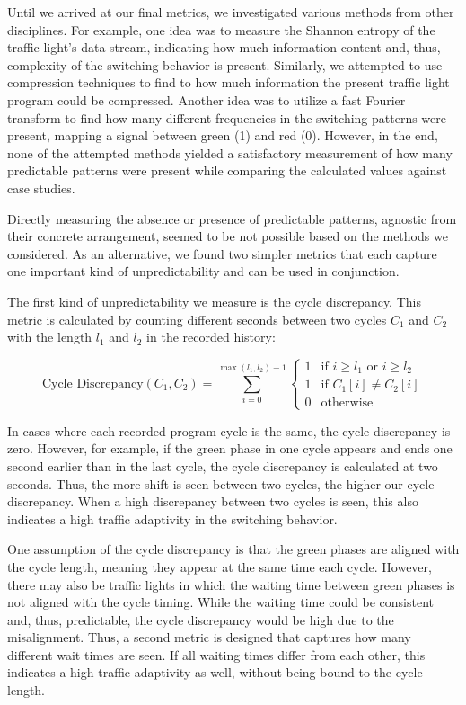 Until we arrived at our final metrics, we investigated various methods from other disciplines. For example, one idea was to measure the Shannon entropy of the traffic light's data stream, indicating how much information content and, thus, complexity of the switching behavior is present. Similarly, we attempted to use compression techniques to find to how much information the present traffic light program could be compressed. Another idea was to utilize a fast Fourier transform to find how many different frequencies in the switching patterns were present, mapping a signal between green (1) and red (0). However, in the end, none of the attempted methods yielded a satisfactory measurement of how many predictable patterns were present while comparing the calculated values against case studies. 

Directly measuring the absence or presence of predictable patterns, agnostic from their concrete arrangement, seemed to be not possible based on the methods we considered. As an alternative, we found two simpler metrics that each capture one important kind of unpredictability and can be used in conjunction.

The first kind of unpredictability we measure is the cycle discrepancy. This metric is calculated by counting different seconds between two cycles $C_1$ and $C_2$ with the length $l_1$ and $l_2$ in the recorded history:

\begin{equation} \text{Cycle Discrepancy}(C_1, C_2) =  \sum_{i=0}^{\max(l_1, l_2)-1} \left\{
\begin{array}{ll}
1 & \text{if } i \geq l_1 \text{ or } i \geq l_2 \\
1 & \text{if } C_1[i] \neq C_2[i] \\
0 & \text{otherwise}
\end{array} \right.\end{equation}

In cases where each recorded program cycle is the same, the cycle discrepancy is zero. However, for example, if the green phase in one cycle appears and ends one second earlier than in the last cycle, the cycle discrepancy is calculated at two seconds. Thus, the more shift is seen between two cycles, the higher our cycle discrepancy. When a high discrepancy between two cycles is seen, this also indicates a high traffic adaptivity in the switching behavior.

One assumption of the cycle discrepancy is that the green phases are aligned with the cycle length, meaning they appear at the same time each cycle. However, there may also be traffic lights in which the waiting time between green phases is not aligned with the cycle timing. While the waiting time could be consistent and, thus, predictable, the cycle discrepancy would be high due to the misalignment. Thus, a second metric is designed that captures how many different wait times are seen. If all waiting times differ from each other, this indicates a high traffic adaptivity as well, without being bound to the cycle length.

